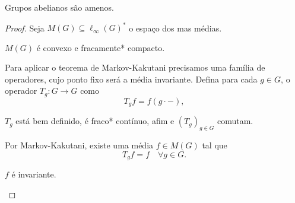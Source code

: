\documentclass[portuguese]{article}
\theoremstyle{definition}
\begin{document}
\begin{teo}
	Grupos abelianos são amenos.
\end{teo}
\begin{proof}
	Seja $M(G)\subseteq\ell_\infty(G)^*$ o espaço dos mas médias.
	\begin{exer*}
		$M(G)$ é convexo e fracamente* compacto.
	\end{exer*}
	Para aplicar o teorema de Markov-Kakutani precisamos uma família de operadores, cujo ponto fixo será a média invariante. Defina para cada $g\in G$, o operador $T_g:G\to G$ como
	\[T_gf=f(g\cdot-),\]
	\begin{exer*}
		$T_g$ está bem definido, é fraco* contínuo, afim e $(T_g)_{g\in G}$ comutam.
	\end{exer*}
	Por Markov-Kakutani, existe uma média $f\in M(G)$ tal que
	\[T_gf=f\quad\forall g\in G.\]
	\begin{exer*}
		$f$ é invariante.
	\end{exer*}
\end{proof}
\end{document}
